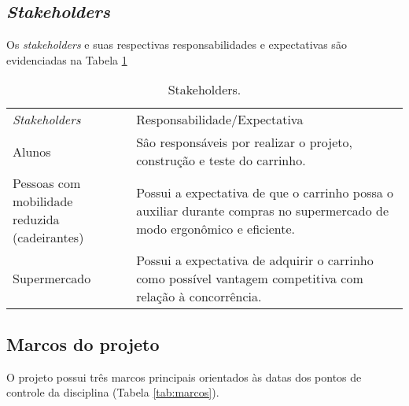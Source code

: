\pagebreak

\subsection{\textit{Stakeholders}}

Os \textit{stakeholders} e suas respectivas responsabilidades e expectativas são evidenciadas na Tabela \ref{tab:stakeholders}
\begin{table}[h]
 \centering
 {\renewcommand\arraystretch{1.25}
 \caption{Stakeholders.}
 \label{tab:stakeholders}
 \begin{tabular}{ l l }
  \cline{1-1}\cline{2-2}  
    \multicolumn{1}{p{3.317cm}|}{\textit{Stakeholders}} &
    \multicolumn{1}{p{9.167cm}}{Responsabilidade/Expectativa}
  \\  
  \cline{1-1}\cline{2-2}  
    \multicolumn{1}{p{3.317cm}|}{Alunos} &
    \multicolumn{1}{p{9.167cm}}{Sâo responsáveis por realizar o projeto, construção e teste do carrinho.}
  \\  
  \cline{1-1}\cline{2-2}  
    \multicolumn{1}{p{3.317cm}|}{Pessoas com mobilidade reduzida (cadeirantes)} &
    \multicolumn{1}{p{9.167cm}}{Possui a expectativa de que o carrinho possa o auxiliar durante compras no supermercado de modo ergonômico e eficiente.}
  \\  
  \cline{1-1}\cline{2-2}  
    \multicolumn{1}{p{3.317cm}|}{Supermercado} &
    \multicolumn{1}{p{9.167cm}}{Possui a expectativa de adquirir o carrinho como possível vantagem competitiva com relação à concorrência.}
  \\  
  \hline

 \end{tabular} }
\end{table}


\subsection{Marcos do projeto}

O projeto possui três marcos principais orientados às datas dos pontos de controle da disciplina (Tabela \ref{tab:marcos}).


